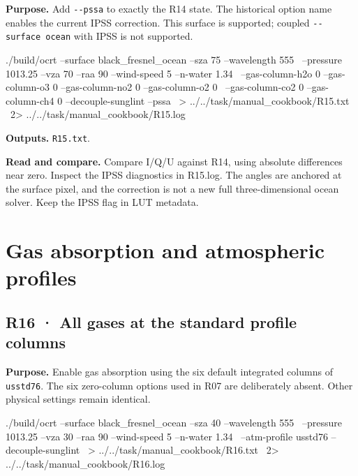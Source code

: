 \label{recipe:R15}

\textbf{Purpose. }Add \texttt{-\allowbreak{}-\allowbreak{}pssa} to exactly the R14 state. The historical option name enables the current IPSS correction. This surface is supported; coupled \texttt{-\allowbreak{}-\allowbreak{}surface ocean} with IPSS is not supported.

\noindent\begin{minipage}{\linewidth}
\begin{ManualCode}

./build/ocrt --surface black_fresnel_ocean --sza 75 --wavelength 555 \
  --pressure 1013.25 --vza 70 --raa 90 --wind-speed 5 --n-water 1.34 \
  --gas-column-h2o 0 --gas-column-o3 0 --gas-column-no2 0 --gas-column-o2 0 \
  --gas-column-co2 0 --gas-column-ch4 0 --decouple-sunglint --pssa \
  > ../../task/manual_cookbook/R15.txt \
  2> ../../task/manual_cookbook/R15.log

\end{ManualCode}
\end{minipage}\par

\textbf{Outputs. }\texttt{R15.txt}.

\textbf{Read and compare. }Compare I/Q/U against R14, using absolute differences near zero. Inspect the IPSS diagnostics in R15.log. The angles are anchored at the surface pixel, and the correction is not a new full three-dimensional ocean solver. Keep the IPSS flag in LUT metadata.

\section{Gas absorption and atmospheric profiles}
\label{sec:auto:09_cookbook:4}


\subsection{R16 · All gases at the standard profile columns}
\label{sec:auto:09_cookbook:4.1}

\label{recipe:R16}

\textbf{Purpose. }Enable gas absorption using the six default integrated columns of \texttt{usstd76}. The six zero-column options used in R07 are deliberately absent. Other physical settings remain identical.

\noindent\begin{minipage}{\linewidth}
\begin{ManualCode}

./build/ocrt --surface black_fresnel_ocean --sza 40 --wavelength 555 \
  --pressure 1013.25 --vza 30 --raa 90 --wind-speed 5 --n-water 1.34 \
  --atm-profile usstd76 --decouple-sunglint \
  > ../../task/manual_cookbook/R16.txt \
  2> ../../task/manual_cookbook/R16.log

\end{ManualCode}
\end{minipage}\par

